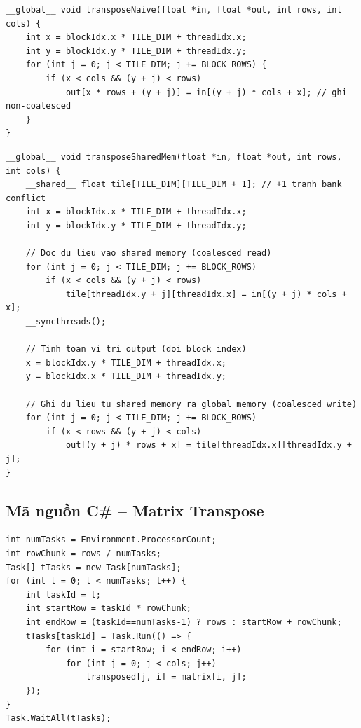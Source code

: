 \documentclass[12pt,a4paper]{article}
\begin{document}
\begin{lstlisting}[style=cudastyle, caption={CUDA Kernel -- Naive Transpose}, label={lst:trans_naive}]
__global__ void transposeNaive(float *in, float *out, int rows, int cols) {
    int x = blockIdx.x * TILE_DIM + threadIdx.x;
    int y = blockIdx.y * TILE_DIM + threadIdx.y;
    for (int j = 0; j < TILE_DIM; j += BLOCK_ROWS) {
        if (x < cols && (y + j) < rows)
            out[x * rows + (y + j)] = in[(y + j) * cols + x]; // ghi non-coalesced
    }
}
\end{lstlisting}

\begin{lstlisting}[style=cudastyle, caption={CUDA Kernel -- Shared Memory Transpose (Optimized)}, label={lst:trans_shared}]
__global__ void transposeSharedMem(float *in, float *out, int rows, int cols) {
    __shared__ float tile[TILE_DIM][TILE_DIM + 1]; // +1 tranh bank conflict
    int x = blockIdx.x * TILE_DIM + threadIdx.x;
    int y = blockIdx.y * TILE_DIM + threadIdx.y;

    // Doc du lieu vao shared memory (coalesced read)
    for (int j = 0; j < TILE_DIM; j += BLOCK_ROWS)
        if (x < cols && (y + j) < rows)
            tile[threadIdx.y + j][threadIdx.x] = in[(y + j) * cols + x];
    __syncthreads();

    // Tinh toan vi tri output (doi block index)
    x = blockIdx.y * TILE_DIM + threadIdx.x;
    y = blockIdx.x * TILE_DIM + threadIdx.y;

    // Ghi du lieu tu shared memory ra global memory (coalesced write)
    for (int j = 0; j < TILE_DIM; j += BLOCK_ROWS)
        if (x < rows && (y + j) < cols)
            out[(y + j) * rows + x] = tile[threadIdx.x][threadIdx.y + j];
}
\end{lstlisting}

\subsection{Mã nguồn C\# -- Matrix Transpose}

\begin{lstlisting}[style=csharpstyle, caption={C\# Thread/Task -- Matrix Transpose}, label={lst:trans_task}]
int numTasks = Environment.ProcessorCount;
int rowChunk = rows / numTasks;
Task[] tTasks = new Task[numTasks];
for (int t = 0; t < numTasks; t++) {
    int taskId = t;
    int startRow = taskId * rowChunk;
    int endRow = (taskId==numTasks-1) ? rows : startRow + rowChunk;
    tTasks[taskId] = Task.Run(() => {
        for (int i = startRow; i < endRow; i++)
            for (int j = 0; j < cols; j++)
                transposed[j, i] = matrix[i, j];
    });
}
Task.WaitAll(tTasks);
\end{lstlisting}
\end{document}
